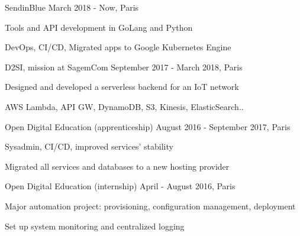 


\begin{cventries}

\cventry
{} %
{SendinBlue} %
{March 2018 - Now, Paris} %
{} %
{ %
\begin{cvitems}
\item {Tools and API development in GoLang and Python}
\item {DevOps, CI/CD, Migrated apps to Google Kubernetes Engine}
\end{cvitems}
}

\cventry
{} %
{D2SI, mission at SagemCom} %
{September 2017 - March 2018, Paris} %
{} %
{ %
\begin{cvitems}
\item {Designed and developed a serverless backend for an IoT network}
\item {AWS Lambda, API GW, DynamoDB, S3, Kinesis, ElasticSearch..}
\end{cvitems}
}

\cventry
{} %
{Open Digital Education (apprenticeship)} %
{August 2016 - September 2017, Paris} %
{} %
{ %
\begin{cvitems}
\item {Sysadmin, CI/CD, improved services' stability}
\item {Migrated all services and databases to a new hosting provider}
\end{cvitems}
}


\cventry
{} %
{Open Digital Education (internship)} %
{April - August 2016, Paris} %
{} %
{ %
\begin{cvitems}
\item {Major automation project: provisioning, configuration management, deployment}
\item {Set up system monitoring and centralized logging}
\end{cvitems}
}



\end{cventries}